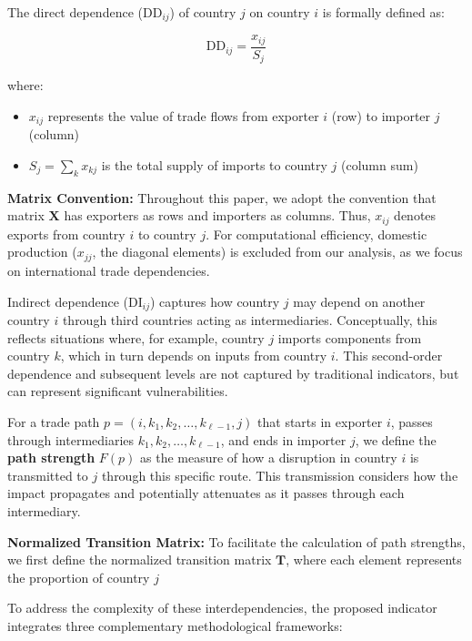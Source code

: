 \documentclass[final,1p,times,authoryear]{elsarticle}
\begin{document}
The direct dependence (DD$_{ij}$) of country $j$ on country $i$ is formally defined as:

\begin{equation}
\text{DD}_{ij} = \frac{x_{ij}}{S_j}
\end{equation}

\noindent where:
\begin{itemize}
    \item $x_{ij}$ represents the value of trade flows from exporter $i$ (row) to importer $j$ (column)
    \item $S_j = \sum_{k} x_{kj}$ is the total supply of imports to country $j$ (column sum)
\end{itemize}

\textbf{Matrix Convention:} Throughout this paper, we adopt the convention that matrix $\mathbf{X}$ has exporters as rows and importers as columns. Thus, $x_{ij}$ denotes exports from country $i$ to country $j$. For computational efficiency, domestic production ($x_{jj}$, the diagonal elements) is excluded from our analysis, as we focus on international trade dependencies.

Indirect dependence (DI$_{ij}$) captures how country $j$ may depend on another country $i$ through third countries acting as intermediaries. Conceptually, this reflects situations where, for example, country $j$ imports components from country $k$, which in turn depends on inputs from country $i$. This second-order dependence and subsequent levels are not captured by traditional indicators, but can represent significant vulnerabilities.

For a trade path $p = (i, k_1, k_2, \ldots, k_{\ell-1}, j)$ that starts in exporter $i$, passes through intermediaries $k_1, k_2, \ldots, k_{\ell-1}$, and ends in importer $j$, we define the \textbf{path strength} $F(p)$ as the measure of how a disruption in country $i$ is transmitted to $j$ through this specific route. This transmission considers how the impact propagates and potentially attenuates as it passes through each intermediary.

\textbf{Normalized Transition Matrix:} To facilitate the calculation of path strengths, we first define the normalized transition matrix $\mathbf{T}$, where each element represents the proportion of country $j$

To address the complexity of these interdependencies, the proposed indicator integrates three complementary methodological frameworks:
\end{document}
